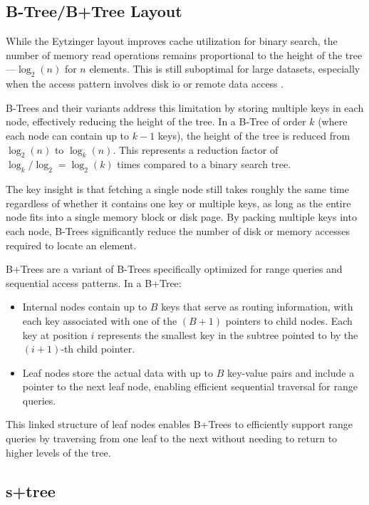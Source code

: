 \subsection{B-Tree/B+Tree Layout}
\label{tb:btree_layout}

While the Eytzinger layout improves cache utilization for binary search, the number of memory read operations remains proportional to the height of the tree—$\log_2(n)$ for $n$ elements. This is still suboptimal for large datasets, especially when the access pattern involves disk \ac{io} or remote data access \citep{static_b_trees}.

B-Trees and their variants address this limitation by storing multiple keys in each node, effectively reducing the height of the tree. In a B-Tree of order $k$ (where each node can contain up to $k-1$ keys), the height of the tree is reduced from $\log_2(n)$ to $\log_k(n)$. This represents a reduction factor of $\log_k/\log_2 = \log_2(k)$ times compared to a binary search tree.

The key insight is that fetching a single node still takes roughly the same time regardless of whether it contains one key or multiple keys, as long as the entire node fits into a single memory block or disk page. By packing multiple keys into each node, B-Trees significantly reduce the number of disk or memory accesses required to locate an element.

B+Trees are a variant of B-Trees specifically optimized for range queries and sequential access patterns. In a B+Tree:
\begin{itemize}
  \item Internal nodes contain up to $B$ keys that serve as routing information, with each key associated with one of the $(B+1)$ pointers to child nodes. Each key at position $i$ represents the smallest key in the subtree pointed to by the $(i+1)$-th child pointer.
  \item Leaf nodes store the actual data with up to $B$ key-value pairs and include a pointer to the next leaf node, enabling efficient sequential traversal for range queries.
\end{itemize}

This linked structure of leaf nodes enables B+Trees to efficiently support range queries by traversing from one leaf to the next without needing to return to higher levels of the tree.

\subsection{\texorpdfstring{\ac{s+tree}}{S+tree}}
\label{tb:stree}

